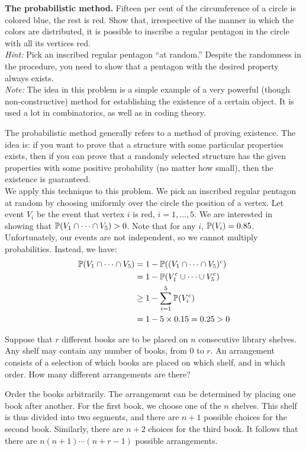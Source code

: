 \documentclass[a4paper, 12pt]{exam}
\begin{document}
\begin{questions}
\question \textbf{The probabilistic method.} Fifteen per cent of the circumference of a circle is colored blue, the rest is red. Show that, irrespective of the manner in which the colors are distributed, it is possible to inscribe a regular pentagon in the circle with all its vertices red.\\
\emph{Hint:} Pick an inscribed regular pentagon “at random.” Despite the randomness in the procedure, you need to show that a pentagon with the desired property always exists.\\
\emph{Note:} The idea in this problem is a simple example of a very powerful (though non-constructive) method for establishing the existence of a certain object. It is used a lot in combinatorics, as well as in coding theory.
\begin{solution}
	The probabilistic method generally refers to a method of proving existence. The idea is: if you want to prove that a structure with some particular properties exists, then if you can prove that a randomly selected structure has the given properties with some positive probability (no matter how small), then the existence is guaranteed.\\
	We apply this technique to this problem. We pick an inscribed regular pentagon at random by choosing uniformly over the circle the position of a vertex. Let event $V_i$ be the event that vertex $i$ is red, $i=1, \dots, 5$. We are interested in showing that $\operatorname{\mathbb{P}}(V_1 \cap \cdots \cap V_5) > 0$. Note that for any $i$, $\operatorname{\mathbb{P}}(V_i)=0.85$. Unfortunately, our events are not independent, so we cannot multiply probabilities. Instead, we have:
	\begin{equation*}
	\begin{aligned}
	\operatorname{\mathbb{P}}(V_1 \cap \cdots \cap V_5) &= 1-\operatorname{\mathbb{P}}((V_1 \cap \cdots \cap V_5)^c)\\
	                                                    &= 1-\operatorname{\mathbb{P}}(V_1^c \cup \cdots \cup V_5^c)\\
	                                                    &\ge 1- \sum_{i=1}^{5}\operatorname{\mathbb{P}}(V_i^c)\\
	                                                    &=1-5\times 0.15 =0.25 >0
	\end{aligned}
	\end{equation*}
\end{solution}


\question Suppose that $r$ different books are to be placed on $n$ consecutive library shelves. Any shelf may contain any number of books, from $0$ to $r$. An arrangement consists of a selection of which books are placed on which shelf, and in which order. How many different arrangements are there?
\begin{solution}
	Order the books arbitrarily. The arrangement can be determined by placing one book after another. For the first book, we choose one of the $n$ shelves. This shelf is thus divided into two segments, and there are $n+1$ possible choices for the second book. Similarly, there are $n+2$ choices for the third book. It follows that there are $n(n + 1) \cdots (n+r-1)$ possible arrangements.
\end{solution}


\end{questions}
\end{document}
